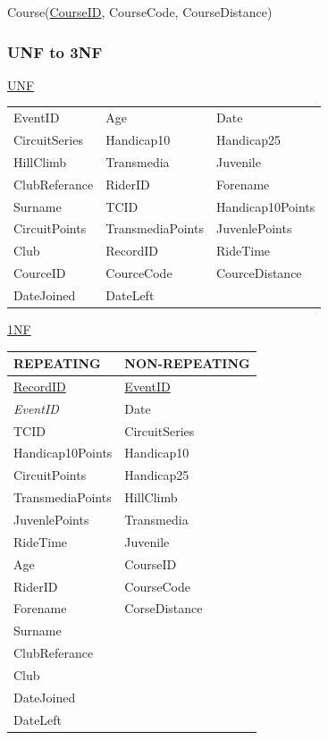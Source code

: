 Course(\underline{CourseID}, CourseCode, CourseDistance)

\subsubsection{UNF to 3NF}
\underline{UNF}


\begin{tabular}{l l l}
EventID       & Age              & Date             \\
CircuitSeries & Handicap10       & Handicap25       \\
HillClimb     & Transmedia       & Juvenile         \\
ClubReferance & RiderID          & Forename         \\
Surname       & TCID             & Handicap10Points \\
CircuitPoints & TransmediaPoints & JuvenlePoints    \\
Club          & RecordID         & RideTime         \\
CourceID      & CourceCode       & CourceDistance   \\
DateJoined    & DateLeft         &                  \\
\end{tabular}

\underline{1NF}

\begin{tabular}{|l|l|}
\hline
REPEATING            & NON-REPEATING       \\ \hline
\underline{RecordID} & \underline{EventID} \\ \hline
\emph{EventID}       & Date                \\ \hline
TCID                 & CircuitSeries       \\ \hline
Handicap10Points     & Handicap10          \\ \hline
CircuitPoints        & Handicap25          \\ \hline 
TransmediaPoints     & HillClimb           \\ \hline 
JuvenlePoints        & Transmedia          \\ \hline
RideTime             & Juvenile            \\ \hline 
Age                  & CourseID            \\ \hline
RiderID              & CourseCode          \\ \hline
Forename             & CorseDistance       \\ \hline
Surname              &                     \\ \hline
ClubReferance        &                     \\ \hline
Club                 &                     \\ \hline
DateJoined           &                     \\ \hline
DateLeft             &                     \\ \hline
\end{tabular}




